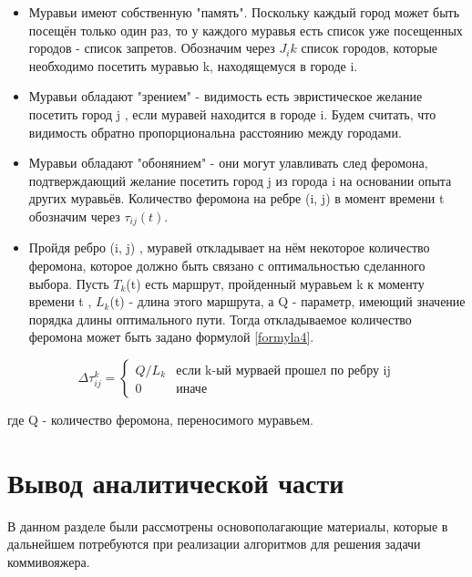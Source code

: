 \begin{itemize}
  \item Муравьи имеют собственную "память". Поскольку каждый город может
  быть посещён только один раз, то у каждого муравья есть список уже
  посещенных городов - список запретов. Обозначим через $J_ik$ список городов, 
  которые необходимо посетить муравью k, находящемуся в городе
  i.
  \item Муравьи обладают "зрением" - видимость есть эвристическое желание 
  посетить город j , если муравей находится в городе i. Будем считать, 
  что видимость обратно пропорциональна расстоянию между городами.
  \item Муравьи обладают "обонянием" - они могут улавливать след феромона,
  подтверждающий желание посетить город j из города i на основании
  опыта других муравьёв. Количество феромона на ребре (i, j) в момент
  времени t обозначим через $\tau_{ij}(t)$.
  \item Пройдя ребро (i, j) , муравей откладывает на нём некоторое количество
  феромона, которое должно быть связано с оптимальностью сделанного
  выбора. Пусть $T_k$(t) есть маршрут, пройденный муравьем k к моменту
  времени t , $L_k$(t) - длина этого маршрута, а Q - параметр, имеющий
  значение порядка длины оптимального пути. Тогда откладываемое количество 
  феромона может быть задано формулой  \ref{formyla4}.
\end{itemize}

\begin{equation*}\label{formyla4}
  \Delta \tau_{ij}^k = 
   \begin{cases}
     Q/L_k&\text{если k-ый мурваей прошел по ребру ij}\\
     0 &\text{иначе}
   \end{cases}
  \end{equation*}

  где Q - количество феромона, переносимого муравьем.

\section{Вывод аналитической части}\label{End_analis_chapter}

В данном разделе были рассмотрены основополагающие материалы,
которые в дальнейшем потребуются при реализации алгоритмов для решения
задачи коммивояжера.

